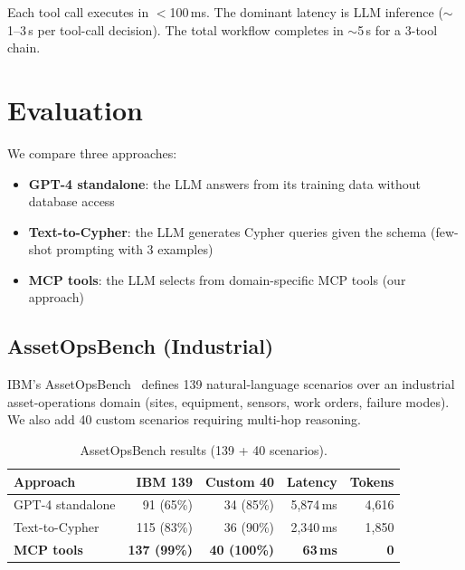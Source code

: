 \documentclass[sigconf]{acmart}
\begin{document}
Each tool call executes in $<$100\,ms.  The dominant latency is
LLM inference (${\sim}$1--3\,s per tool-call decision).  The total
workflow completes in ${\sim}$5\,s for a 3-tool chain.

\section{Evaluation}\label{sec:evaluation}

We compare three approaches:

\begin{itemize}
\item \textbf{GPT-4 standalone}: the LLM answers from its training
  data without database access
\item \textbf{Text-to-Cypher}: the LLM generates Cypher queries
  given the schema (few-shot prompting with 3 examples)
\item \textbf{MCP tools}: the LLM selects from domain-specific
  MCP tools (our approach)
\end{itemize}

\subsection{AssetOpsBench (Industrial)}

IBM's AssetOpsBench~\cite{baek2024assetopsbench} defines 139
natural-language scenarios over an industrial asset-operations
domain (sites, equipment, sensors, work orders, failure modes).
We also add 40 custom scenarios requiring multi-hop reasoning.

\begin{table}[t]
\centering
\caption{AssetOpsBench results (139 + 40 scenarios).}
\label{tab:assetops}
\small
\begin{tabular}{@{}lrrrr@{}}
\toprule
\textbf{Approach} & \textbf{IBM 139} & \textbf{Custom 40}
  & \textbf{Latency} & \textbf{Tokens} \\
\midrule
GPT-4 standalone  & 91 (65\%) & 34 (85\%) & 5,874\,ms & 4,616 \\
Text-to-Cypher    & 115 (83\%) & 36 (90\%) & 2,340\,ms & 1,850 \\
\textbf{MCP tools}& \textbf{137 (99\%)} & \textbf{40 (100\%)}
  & \textbf{63\,ms} & \textbf{0} \\
\bottomrule
\end{tabular}
\end{table}
\end{document}
